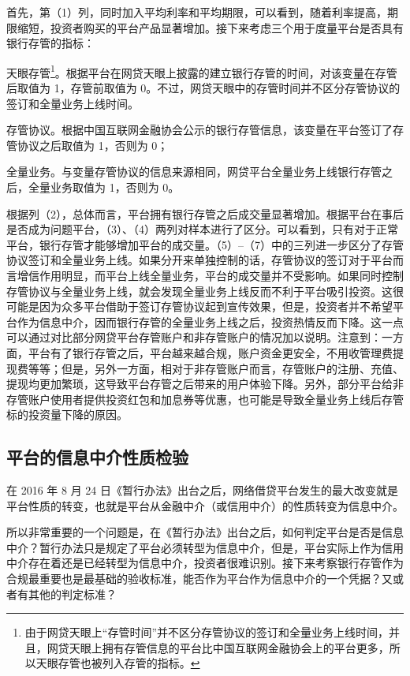 \documentclass[lang=cn,11pt]{elegantpaper}
\begin{document}
首先，第（1）列，同时加入平均利率和平均期限，可以看到，随着利率提高，期限缩短，投资者购买的平台产品显著增加。接下来考虑三个用于度量平台是否具有银行存管的指标：
\begin{enumerate*}[label=（\arabic*）]
    \item 天眼存管\footnote{由于网贷天眼上“存管时间”并不区分存管协议的签订和全量业务上线时间，并且，网贷天眼上拥有存管信息的平台比中国互联网金融协会上的平台更多，所以天眼存管也被列入存管的指标。}。根据平台在网贷天眼上披露的建立银行存管的时间，对该变量在存管后取值为 1，存管前取值为 0。不过，网贷天眼中的存管时间并不区分存管协议的签订和全量业务上线时间。
    \item 存管协议。根据中国互联网金融协会公示的银行存管信息，该变量在平台签订了存管协议之后取值为 1，否则为 0；
    \item 全量业务。与变量存管协议的信息来源相同，网贷平台全量业务上线银行存管之后，全量业务取值为 1，否则为 0。
\end{enumerate*}

根据列（2），总体而言，平台拥有银行存管之后成交量显著增加。根据平台在事后是否成为问题平台，（3）、（4）两列对样本进行了区分。可以看到，只有对于正常平台，银行存管才能够增加平台的成交量。（5）--（7）中的三列进一步区分了存管协议签订和全量业务上线。如果分开来单独控制的话，存管协议的签订对于平台而言增信作用明显，而平台上线全量业务，平台的成交量并不受影响。如果同时控制存管协议与全量业务上线，就会发现全量业务上线反而不利于平台吸引投资。这很可能是因为众多平台借助于签订存管协议起到宣传效果，但是，投资者并不希望平台作为信息中介，因而银行存管的全量业务上线之后，投资热情反而下降。这一点可以通过对比部分网贷平台存管账户和非存管账户的情况加以说明。注意到：一方面，平台有了银行存管之后，平台越来越合规，账户资金更安全，不用收管理费提现费等等；但是，另外一方面，相对于非存管账户而言，存管账户的注册、充值、提现均更加繁琐，这导致平台存管之后带来的用户体验下降。另外，部分平台给非存管账户使用者提供投资红包和加息券等优惠，也可能是导致全量业务上线后存管标的投资量下降的原因。

\subsection{平台的信息中介性质检验}

在 2016 年 8 月 24 日《暂行办法》出台之后，网络借贷平台发生的最大改变就是平台性质的转变，也就是平台从金融中介（或信用中介）的性质转变为信息中介。

所以非常重要的一个问题是，在《暂行办法》出台之后，如何判定平台是否是信息中介？暂行办法只是规定了平台必须转型为信息中介，但是，平台实际上作为信用中介存在着还是已经转型为信息中介，投资者很难识别。接下来考察银行存管作为合规最重要也是最基础的验收标准，能否作为平台作为信息中介的一个凭据？又或者有其他的判定标准？
\end{document}
